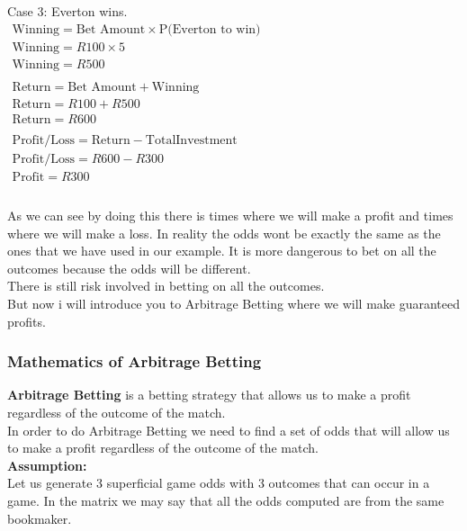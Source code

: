 Case 3: Everton wins. \\

\begin{math}
\begin{array}{l}
\text{Winning} = \text{Bet Amount} \times \text{P(Everton to win)} \\
\text{Winning} = R100 \times 5 \\
\text{Winning} = R500 \\
\\
\text{Return} = \text{Bet Amount} + \text{Winning} \\
\text{Return} = R100 + R500 \\
\text{Return} = R600 \\
\\
\text{Profit/Loss} = \text{Return} - \text{TotalInvestment} \\
\text{Profit/Loss} = R600 - R300 \\
\text{Profit} = R300 \\
\\
\end{array}
\end{math}

As we can see by doing this there is times where we will make a profit and times where we will make a loss. In reality the odds wont be exactly the same as the ones that we have used in our example. It is more dangerous to bet on all the outcomes because the odds will be different. \\
There is still risk involved in betting on all the outcomes. \\
But now i will introduce you to Arbitrage Betting where we will make guaranteed profits. \\

\subsubsection{Mathematics of Arbitrage Betting}

\textbf{Arbitrage Betting} is a betting strategy that allows us to make a profit regardless of the outcome of the match. \\

In order to do Arbitrage Betting we need to find a set of odds that will allow us to make a profit regardless of the outcome of the match. \\

\textbf{Assumption:} \\

Let us generate 3 superficial game odds with 3 outcomes that can occur in a game. In the matrix we may say that all the odds computed are from the same bookmaker. \\

